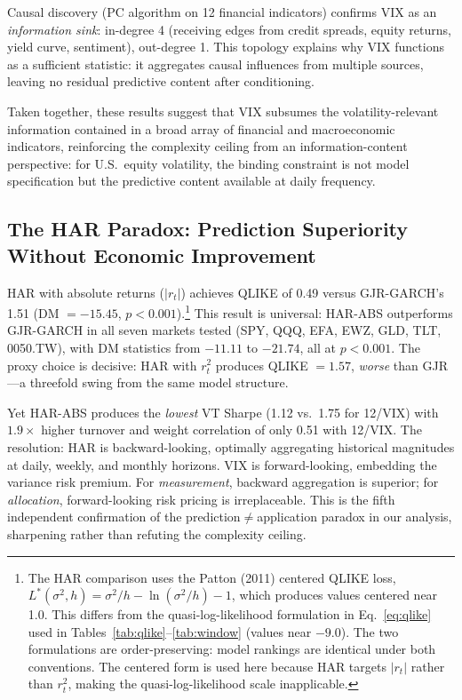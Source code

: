 Causal discovery (PC algorithm on 12 financial indicators) confirms VIX as an \textit{information sink}: in-degree 4 (receiving edges from credit spreads, equity returns, yield curve, sentiment), out-degree 1. This topology explains why VIX functions as a sufficient statistic: it aggregates causal influences from multiple sources, leaving no residual predictive content after conditioning.

Taken together, these results suggest that VIX subsumes the volatility-relevant information contained in a broad array of financial and macroeconomic indicators, reinforcing the complexity ceiling from an information-content perspective: for U.S.\ equity volatility, the binding constraint is not model specification but the predictive content available at daily frequency.

\subsection{The HAR Paradox: Prediction Superiority Without Economic Improvement}
\label{sec:har_paradox}

HAR with absolute returns ($|r_t|$) achieves QLIKE of 0.49 versus GJR-GARCH's 1.51 (DM $= -15.45$, $p < 0.001$).\footnote{The HAR comparison uses the Patton (2011) centered QLIKE loss, $L^*(\sigma^2, h) = \sigma^2/h - \ln(\sigma^2/h) - 1$, which produces values centered near 1.0. This differs from the quasi-log-likelihood formulation in Eq.~\eqref{eq:qlike} used in Tables~\ref{tab:qlike}--\ref{tab:window} (values near $-9.0$). The two formulations are order-preserving: model rankings are identical under both conventions. The centered form is used here because HAR targets $|r_t|$ rather than $r^2_t$, making the quasi-log-likelihood scale inapplicable.} This result is universal: HAR-ABS outperforms GJR-GARCH in all seven markets tested (SPY, QQQ, EFA, EWZ, GLD, TLT, 0050.TW), with DM statistics from $-11.11$ to $-21.74$, all at $p < 0.001$. The proxy choice is decisive: HAR with $r^2_t$ produces QLIKE $= 1.57$, \textit{worse} than GJR---a threefold swing from the same model structure.

Yet HAR-ABS produces the \textit{lowest} VT Sharpe (1.12 vs.\ 1.75 for 12/VIX) with $1.9\times$ higher turnover and weight correlation of only 0.51 with 12/VIX. The resolution: HAR is backward-looking, optimally aggregating historical magnitudes at daily, weekly, and monthly horizons. VIX is forward-looking, embedding the variance risk premium. For \textit{measurement}, backward aggregation is superior; for \textit{allocation}, forward-looking risk pricing is irreplaceable. This is the fifth independent confirmation of the prediction$\neq$application paradox in our analysis, sharpening rather than refuting the complexity ceiling.

